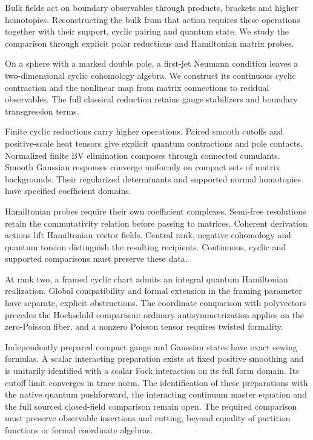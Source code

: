 Bulk fields act on boundary observables through products, brackets and
higher homotopies. Reconstructing the bulk from that action requires
these operations together with their support, cyclic pairing and
quantum state. We study the comparison through explicit polar
reductions and Hamiltonian matrix probes.

On a sphere with a marked double pole, a first-jet Neumann condition
leaves a two-dimensional cyclic cohomology algebra. We construct its
continuous cyclic contraction and the nonlinear map from matrix
connections to residual observables. The full classical reduction
retains gauge stabilizers and boundary transgression terms.

Finite cyclic reductions carry higher operations. Paired smooth cutoffs and
positive-scale heat tensors give explicit quantum contractions and
pole contacts. Normalized finite BV elimination composes through
connected cumulants. Smooth Gaussian responses converge uniformly on
compact sets of matrix backgrounds. Their regularized determinants
and supported normal homotopies have specified coefficient domains.

Hamiltonian probes require their own coefficient complexes.
Semi-free resolutions retain the commutativity relation before passing
to matrices. Coherent derivation actions lift Hamiltonian vector fields.
Central rank, negative cohomology and quantum
torsion distinguish the resulting recipients. Continuous, cyclic and
supported comparisons must preserve these data.

At rank two, a framed
cyclic chart admits an integral quantum Hamiltonian realization.
Global compatibility and formal extension in the framing parameter
have separate, explicit obstructions. The coordinate comparison with
polyvectors precedes the Hochschild comparison: ordinary
antisymmetrization applies on the zero-Poisson fiber, and a nonzero
Poisson tensor requires twisted formality.

Independently prepared compact gauge and Gaussian states have exact
sewing formulas. A scalar interacting preparation exists at fixed
positive smoothing and is unitarily identified with a scalar Fock
interaction on its full form domain. Its cutoff limit converges in
trace norm. The identification of these preparations with the native quantum
pushforward, the interacting continuum master equation and the full
sourced closed-field comparison remain open. The required comparison
must preserve observable insertions and cutting, beyond equality of
partition functions or formal coordinate algebras.
